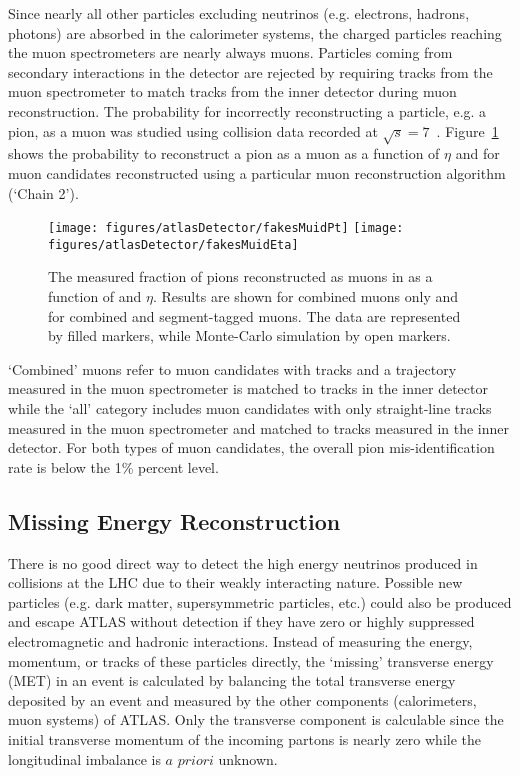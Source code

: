 Since nearly all other particles excluding neutrinos (e.g. electrons, hadrons, photons) are absorbed in the calorimeter systems, the charged particles reaching the muon spectrometers are nearly always muons. Particles coming from secondary interactions in the detector are rejected by requiring tracks from the muon spectrometer to match tracks from the inner detector during muon reconstruction. %
The probability for incorrectly reconstructing a particle, e.g. a pion, as a muon was studied using collision data recorded at $\sqrt{s}=7$~\cite{ATLAS-CONF-2010-064}. Figure~\ref{fig:muidFakeRates} shows the probability to reconstruct a pion as a muon as a function of $\eta$ and \pt for muon candidates reconstructed using a particular muon reconstruction algorithm (`Chain 2'). 
\begin{figure}[h!]
\centering
\label{fig:muidFakeRates}
\texttt{[image: figures/atlasDetector/fakesMuidPt]}
\texttt{[image: figures/atlasDetector/fakesMuidEta]}
\caption{The measured fraction of pions reconstructed as muons in as a function of \pt and $\eta$. Results are shown for combined muons only and for combined and segment-tagged muons. The data are represented by filled markers, while Monte-Carlo simulation by open markers.}
\end{figure}
`Combined' muons refer to muon candidates with tracks and a trajectory measured in the muon spectrometer is matched to tracks in the inner detector while the `all' category includes muon candidates with only straight-line tracks measured in the muon spectrometer and matched to tracks measured in the inner detector. For both types of muon candidates, the overall pion mis-identification rate is below the 1\% percent level.

\subsection{Missing Energy Reconstruction}
There is no good direct way to detect the high energy neutrinos produced in collisions at the LHC due to their weakly interacting nature. Possible new particles (e.g. dark matter, supersymmetric particles, etc.) could also be produced and escape ATLAS without detection if they have zero or highly suppressed electromagnetic and hadronic interactions. Instead of measuring the energy, momentum, or tracks of these particles directly, the `missing' transverse energy (MET) in an event is calculated by balancing the total transverse energy deposited by an event and measured by the other components (calorimeters, muon systems) of ATLAS. Only the transverse component is calculable since the initial transverse momentum of the incoming partons is nearly zero while the longitudinal imbalance is $a$ $priori$ unknown.

